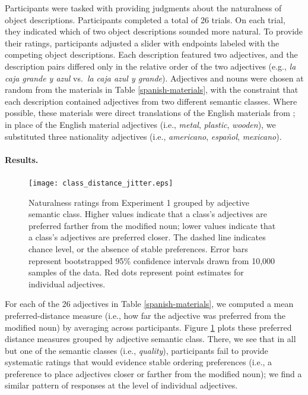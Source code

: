 \documentclass[12pt,letterpaper]{article}
\begin{document}
Participants were tasked with providing judgments about the naturalness of object descriptions. Participants completed a total of 26 trials. On each trial, they indicated which of two object descriptions sounded more natural. To provide their ratings, participants adjusted a slider with endpoints labeled with the competing object descriptions. Each description featured two adjectives, and the description pairs differed only in the relative order of the two adjectives (e.g., \emph{la caja grande y azul} vs.~\emph{la caja azul y grande}). Adjectives and nouns were chosen at random from the materials in Table \ref{spanish-materials}, with the constraint that each description contained adjectives from two different semantic classes. Where possible, these materials were direct translations of the English materials from \cite{scontrasetal2017adjectives}; in place of the English material adjectives (i.e., \emph{metal}, \emph{plastic}, \emph{wooden}), we substituted three nationality adjectives (i.e., \emph{americano}, \emph{espa\~{n}ol}, \emph{mexicano}).



\paragraph{Results.}

\begin{figure}
	\centering
	\texttt{[image: class\_distance\_jitter.eps]}
	\caption{Naturalness ratings from Experiment 1 grouped by adjective semantic class. Higher values indicate that a class's adjectives are preferred farther from the modified noun; lower values indicate that a class's adjectives are preferred closer. The dashed line indicates chance level, or the absence of stable preferences. Error bars represent bootstrapped 95\% confidence intervals drawn from 10,000 samples of the data. Red dots represent point estimates for individual adjectives.
	}
	\label{exp1-results}
\end{figure}

For each of the 26 adjectives in Table \ref{spanish-materials}, we computed a mean preferred-distance measure (i.e., how far the adjective was preferred from the modified noun) by averaging across participants. Figure \ref{exp1-results} plots these preferred distance measures grouped by adjective semantic class. There, we see that in all but one of the semantic classes (i.e., \emph{quality}), participants fail to provide systematic ratings that would evidence stable ordering preferences (i.e., a preference to place adjectives closer or farther from the modified noun); we find a similar pattern of responses at the level of individual adjectives.
\end{document}
